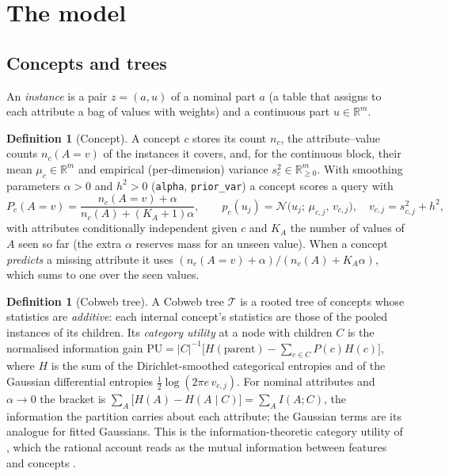 \documentclass[11pt]{article}
\theoremstyle{definition}
\newtheorem{definition}[theorem]{Definition}
\theoremstyle{remark}
\newcommand{\R}{\mathbb{R}}
\newcommand{\N}{\mathcal{N}}
\newcommand{\T}{\mathcal{T}}
\begin{document}
\section{The model}\label{sec:model}

\subsection{Concepts and trees}

An \emph{instance} is a pair $z=(a,u)$ of a nominal part $a$ (a table that assigns to
each attribute a bag of values with weights) and a continuous part $u\in\R^m$.

\begin{definition}[Concept]\label{def:concept}
A concept $c$ stores its count $n_c$, the attribute--value counts $n_c(A{=}v)$ of the
instances it covers, and, for the continuous block, their mean $\mu_c\in\R^m$ and
empirical (per-dimension) variance $s_c^2\in\R^m_{\ge0}$.  With smoothing parameters
$\alpha>0$ and $h^2>0$ (\texttt{alpha}, \texttt{prior\_var}) a concept scores a query
with
\[
  P_c(A{=}v)=\frac{n_c(A{=}v)+\alpha}{n_c(A)+(K_A+1)\alpha},\qquad
  p_c(u_j)=\N\bigl(u_j;\,\mu_{c,j},\,v_{c,j}\bigr),\quad v_{c,j}=s^2_{c,j}+h^2,
\]
with attributes conditionally independent given $c$ and $K_A$ the number of values of $A$
seen so far (the extra $\alpha$ reserves mass for an unseen value).  When a concept
\emph{predicts} a missing attribute it uses $(n_c(A{=}v)+\alpha)/(n_c(A)+K_A\alpha)$,
which sums to one over the seen values.
\end{definition}

\begin{definition}[Cobweb tree]
A Cobweb tree $\T$ is a rooted tree of concepts whose statistics are \emph{additive}:
each internal concept's statistics are those of the pooled instances of its children.
Its \emph{category utility} at a node with children $C$ is the normalised information
gain $\mathrm{PU}=|C|^{-1}\bigl[H(\text{parent})-\sum_{c\in C}P(c)H(c)\bigr]$, where
$H$ is the sum of the Dirichlet-smoothed categorical entropies and of the Gaussian
differential entropies $\tfrac12\log(2\pi e\,v_{c,j})$.  For nominal attributes and
$\alpha\to0$ the bracket is $\sum_A\bigl[H(A)-H(A\mid C)\bigr]=\sum_AI(A;C)$, the
information the partition carries about each attribute; the Gaussian terms are its
analogue for fitted Gaussians.  This is the information-theoretic category utility of
\citet{corter1992}, which the rational account reads as the mutual information between
features and concepts \citep{maclellan2026rational}.
\end{definition}
\end{document}
